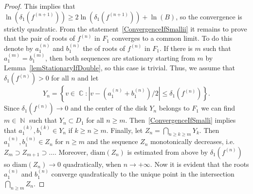 \documentclass{amsart}
\numberwithin{equation}{section}
\theoremstyle{definition}
\theoremstyle{remark}
\DeclareMathOperator{\CC}{\mathbb C}
\DeclareMathOperator{\NN}{\mathbb N}
\begin{document}
\begin{proof}
		This implies that $\ln(\delta_1(f^{(n+1)})) \ge 2\ln(\delta_1(f^{(n+1)})) + \ln(B)$, so the convergence is strictly quadratic. From the statement~\ref{ConvergenceIfSmallii} it remains to prove that the pair of roots of $f^{(n)}$ in $F_1$ converges to a common limit. To do this denote by $a_1^{(n)}$ and $b_1^{(n)}$ the of roots of $f^{(n)}$ in $F_1$. If there is $m$ such that $a_1^{(m)} = b_1^{(m)}$, then both sequences are stationary starting from $m$ by Lemma~\ref{lemStationaryIfDouble}, so this case is trivial. Thus, we assume that $\delta_1(f^{(n)}) > 0$ for all $n$ and let \[Y_n = \left\{v \in \CC: \left|v - \left(a_1^{(n)} + b_1^{(n)}\right)/2\right| \le \delta_1\left(f^{(n)}\right)\right\}.\] Since $\delta_1(f^{(n)}) \to 0$ and the center of the disk $Y_n$ belongs to $F_1$ we can find $m \in \NN$ such that $Y_n \subset D_1$ for all $n \ge m$. Then~\ref{ConvergenceIfSmalli} implies that $a_1^{(k)}, b_1^{(k)} \in Y_n$ if $k \ge n \ge m$. Finally, let $Z_n = \bigcap_{n \ge k \ge m} Y_k$. Then $a_1^{(n)}, b_1^{(n)} \in Z_n$ for $n \ge m$ and the sequence $Z_n$ monotonically decreases, i.e. $Z_m \supset Z_{m+1} \supset \dots$. Moreover, $\mathrm{diam}(Z_n)$ is estimated from above by $\delta_1(f^{(n)})$ so $\mathrm{diam}(Z_n) \to 0$ quadratically, when $n \to +\infty$. Now it is evident that the roots $a_1^{(n)}$ and $b_1^{(n)}$ converge quadratically to the unique point in the intersection $\bigcap_{n \ge m} Z_n$.
		

\end{proof}
\end{document}
